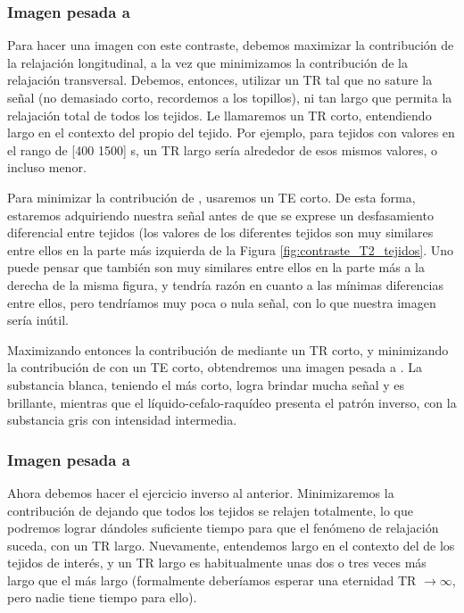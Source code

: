 \subsubsection{Imagen pesada a \Tone}
Para hacer una imagen con este contraste, debemos maximizar la contribución de la relajación longitudinal, a la vez que minimizamos la contribución de la relajación transversal. Debemos, entonces, utilizar un TR tal que no sature la señal (no demasiado corto, recordemos a los topillos), ni tan largo que permita la relajación total de todos los tejidos. Le llamaremos un TR corto, entendiendo largo en el contexto del \Tone propio del tejido. Por ejemplo, para tejidos con valores \Tone en el rango de [400 1500] s, un TR largo sería alrededor de esos mismos valores, o incluso menor.

Para minimizar la contribución de \Ttwo, usaremos un TE corto. De esta forma, estaremos adquiriendo nuestra señal antes de que se exprese un desfasamiento diferencial entre tejidos (los valores de los diferentes tejidos son muy similares entre ellos en la parte más izquierda de la Figura \ref{fig:contraste_T2_tejidos}. Uno puede pensar que también son muy similares entre ellos en la parte más a la derecha de la misma figura, y tendría razón en cuanto a las mínimas diferencias entre ellos, pero tendríamos muy poca o nula señal, con lo que nuestra imagen sería inútil.

Maximizando entonces la contribución de \Tone mediante un TR corto, y minimizando la contribución de \Ttwo con un TE corto, obtendremos una imagen pesada a \Tone. La substancia blanca, teniendo el \Tone más corto, logra brindar mucha señal y es brillante, mientras que el líquido-cefalo-raquídeo presenta el patrón inverso, con la substancia gris con intensidad intermedia.

\subsubsection{Imagen pesada a \Ttwo}
Ahora debemos hacer el ejercicio inverso al anterior. Minimizaremos la contribución de \Tone dejando que todos los tejidos se relajen totalmente, lo que podremos lograr dándoles suficiente tiempo para que el fenómeno de relajación suceda, con un TR largo. Nuevamente, entendemos largo en el contexto del \Tone de los tejidos de interés, y un TR largo es habitualmente unas dos o tres veces más largo que el \Tone más largo (formalmente deberíamos esperar una eternidad TR $\xrightarrow{}\infty$, pero nadie tiene tiempo para ello).

